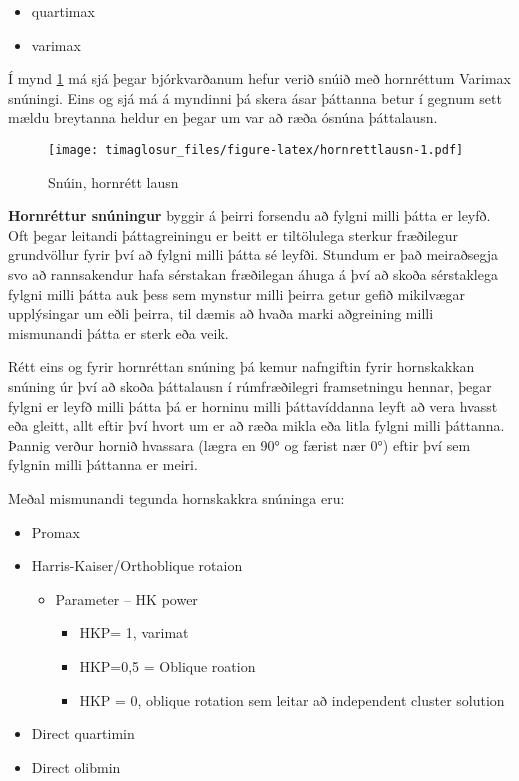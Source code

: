 \documentclass[]{book}
\providecommand{\tightlist}{%
  \setlength{\itemsep}{0pt}\setlength{\parskip}{0pt}}
\begin{document}
\begin{itemize}
\tightlist
\item
  quartimax
\item
  varimax
\end{itemize}

Í mynd \ref{fig:hornrettlausn} má sjá þegar bjórkvarðanum hefur verið snúið með hornréttum Varimax snúningi. Eins og sjá má á myndinni þá skera ásar þáttanna betur í gegnum sett mældu breytanna heldur en þegar um var að ræða ósnúna þáttalausn.

\begin{figure}
\centering
\texttt{[image: timaglosur\_files/figure-latex/hornrettlausn-1.pdf]}
\caption{\label{fig:hornrettlausn}Snúin, hornrétt lausn}
\end{figure}

\textbf{Hornréttur snúningur} byggir á þeirri forsendu að fylgni milli þátta er leyfð. Oft þegar leitandi þáttagreiningu er beitt er tiltölulega sterkur fræðilegur grundvöllur fyrir því að fylgni milli þátta sé leyfði. Stundum er það meiraðsegja svo að rannsakendur hafa sérstakan fræðilegan áhuga á því að skoða sérstaklega fylgni milli þátta auk þess sem mynstur milli þeirra getur gefið mikilvægar upplýsingar um eðli þeirra, til dæmis að hvaða marki aðgreining milli mismunandi þátta er sterk eða veik.

Rétt eins og fyrir hornréttan snúning þá kemur nafngiftin fyrir hornskakkan snúning úr því að skoða þáttalausn í rúmfræðilegri framsetningu hennar, þegar fylgni er leyfð milli þátta þá er horninu milli þáttavíddanna leyft að vera hvasst eða gleitt, allt eftir því hvort um er að ræða mikla eða litla fylgni milli þáttanna. Þannig verður hornið hvassara (lægra en 90° og færist nær 0°) eftir því sem fylgnin milli þáttanna er meiri.

Meðal mismunandi tegunda hornskakkra snúninga eru:

\begin{itemize}
\tightlist
\item
  Promax
\item
  Harris-Kaiser/Orthoblique rotaion

  \begin{itemize}
  \tightlist
  \item
    Parameter -- HK power

    \begin{itemize}
    \tightlist
    \item
      HKP= 1, varimat
    \item
      HKP=0,5 = Oblique roation
    \item
      HKP = 0, oblique rotation sem leitar að independent cluster solution
    \end{itemize}
  \end{itemize}
\item
  Direct quartimin
\item
  Direct olibmin
\end{itemize}
\end{document}
